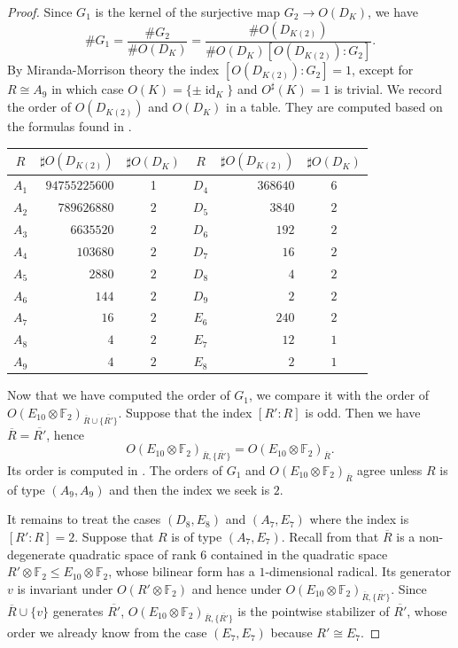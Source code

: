 \documentclass[a4paper]{amsart}
\theoremstyle{definition}
\theoremstyle{plain}
\DeclareMathOperator{\id}{id}
\newcommand{\FF}{\mathbb{F}}
\begin{document}
\begin{proof}
Since $G_1$ is the kernel of the surjective map $G_2 \to O(D_{K})$, we have 
\[ \# G_1 =\frac{\# G_2}{\#O(D_K)} =\frac{\# O(D_{K(2)})}{  \# O(D_K)  [O(D_{K(2)}): G_2 ]}.\]
By Miranda-Morrison theory the index $[O(D_{K(2)}):G_2]=1$, except for $R\cong A_9$ in which case $O(K) = \{\pm \id_{K}\}$ and $O^\sharp(K)=1$ is trivial. We record 
the order of $O(D_{K(2)})$ and $O(D_K)$ in a table. They are computed based on the formulas  found in \cite{brandhorst-veniani}.\\
\noindent
\begin{center}
\begin{tabular}{crc|crc}
$R$ & $\sharp O(D_{K(2)})$ & $\sharp O(D_K)$ & $R$ & $\sharp O(D_{K(2)})$ & $\sharp O(D_K)$  \\
\hline 
$A_1$ & $94755225600$ & 1  & $D_4$& $368640 $& $6 $\\
$A_2$ & $ 789626880 $&$ 2$ & $D_5$& $3840 $&$2 $\\
$A_3$ & $ 6635520 $&$ 2$ & $D_6$&$ 192$&$2 $\\
$A_4$ & $ 103680 $&$ 2$ & $D_7$&$ 16$&$2 $\\
$A_5$ & $ 2880$&$ 2$ & $D_8$&$4 $&$ 2$\\
$A_6$ & $ 144 $&$ 2$ & $D_9$&$2 $&$ 2$\\
$A_7$ & $ 16$&$ 2$& $E_6$ & $240$ & $2$\\
$A_8$ & $ 4$&$ 2$ & $E_7$ & $12$ & $1$\\
$A_9$ & $ 4$& $2$& $E_8$ & $2$ & $1$
\end{tabular}
\end{center}

Now that we have computed the order of $G_1$, we compare it with the order of 
$O(E_{10}\otimes \FF_2)_{\overline{R}\cup \{\overline{R'}\}}$.
Suppose that the index $[R':R]$ is odd. Then we have 
$\overline{R}=\overline{R'}$, hence 
\[O(E_{10}\otimes \FF_2)_{\overline{R},\{\overline{R'}\}}= O(E_{10}\otimes \FF_2)_{\overline{R}}.\]
Its order is computed in .
The orders of $G_1$ and $O(E_{10}\otimes \FF_2)_{\overline{R}}$ agree unless $R$ is of type $(A_9,A_9)$ and then the index we seek is $2$.

It remains to treat the cases $(D_8,E_8)$ and $(A_7,E_7)$ where the index is $[R':R]=2$.
Suppose that $R$ is of type $(A_7,E_7)$. Recall from  that $\overline{R}$ is a non-degenerate quadratic space of rank $6$ contained in the quadratic space $R'\otimes \FF_2 \leq E_{10}\otimes\FF_2$, whose bilinear form has a $1$-dimensional radical. Its generator $v$ is invariant under $O(R'\otimes \FF_2)$ and hence under $O(E_{10}\otimes \FF_2)_{\overline{R},\{\overline{R'}\}}$. 
Since $\overline{R} \cup \{v\}$ generates $\overline{R'}$, $O(E_{10}\otimes \FF_2)_{\overline{R},\{\overline{R'}\}}$ is the pointwise stabilizer of $\overline{R'}$, whose order we already know from the case $(E_7,E_7)$ because $R' \cong E_7$.


\end{proof}
\end{document}
